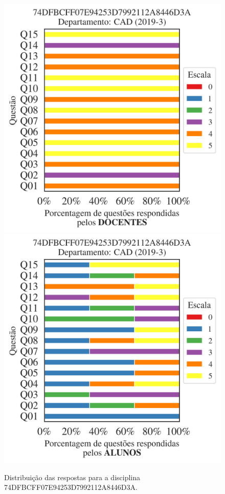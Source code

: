 \documentclass[a4paper,10pt]{article}
\begin{document}
\begin{figure}[h]
\centering
\includegraphics[width=0.485\linewidth]{analise_disciplina_departamento_CAD_74DFBCFF07E94253D7992112A8446D3A_docentes.png}
\includegraphics[width=0.485\linewidth]{analise_disciplina_departamento_CAD_74DFBCFF07E94253D7992112A8446D3A_alunos.png}
\caption{\label{fig:analise_geral_departamento}                Distribuição das respostas para a disciplina 74DFBCFF07E94253D7992112A8446D3A. }
\end{figure}
\end{document}
